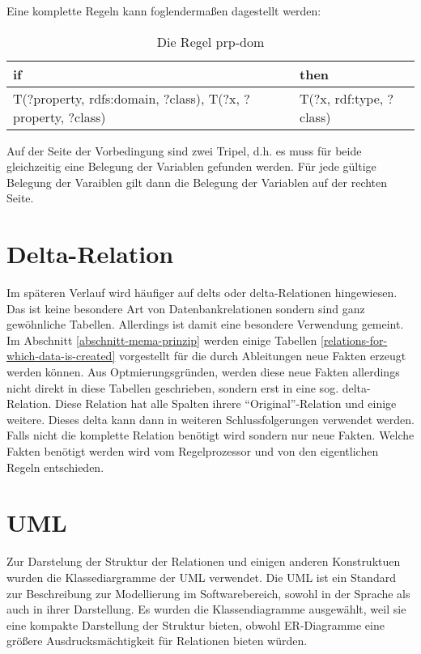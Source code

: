 Eine komplette Regeln kann foglendermaßen dagestellt werden:

\begin{table}[htb]
\begin{center}
\begin{tabular}{m{6cm}|m{4cm}}
if & then \\ \hline
T(?property, rdfs:domain, ?class),\newline
T(?x, ?property, ?class) & T(?x, rdf:type, ?class)
\end{tabular}
\end{center}
\caption{Die Regel prp-dom}
\label{rule-prp-dom}
\end{table}

Auf der Seite der Vorbedingung sind zwei Tripel, d.h. es muss für beide gleichzeitig eine Belegung der Variablen gefunden werden. Für jede gültige Belegung der Varaiblen gilt dann die Belegung der Variablen auf der rechten Seite.

\section{Delta-Relation}
Im späteren Verlauf wird häufiger auf delts oder delta-Relationen hingewiesen. Das ist keine besondere Art von Datenbankrelationen sondern sind ganz gewöhnliche Tabellen. Allerdings ist damit eine besondere Verwendung gemeint. Im Abschnitt \ref{abschnitt-mema-prinzip} werden einige Tabellen \ref{relations-for-which-data-is-created} vorgestellt für die durch Ableitungen neue Fakten erzeugt werden können. Aus Optmierungsgründen, werden diese neue Fakten allerdings nicht direkt in diese Tabellen geschrieben, sondern erst in eine sog. delta-Relation. Diese Relation hat alle Spalten ihrere ``Original''-Relation und einige weitere. Dieses delta kann dann in weiteren Schlussfolgerungen verwendet werden. Falls nicht die komplette Relation benötigt wird sondern nur neue Fakten. Welche Fakten benötigt werden wird vom Regelprozessor und von den eigentlichen Regeln entschieden.


\section{UML}
Zur Darstelung der Struktur der Relationen und einigen anderen Konstruktuen wurden die Klassediargramme der UML\cite{UML2} verwendet. Die UML ist ein Standard zur Beschreibung zur Modellierung im Softwarebereich, sowohl in der Sprache als auch in ihrer Darstellung. Es wurden die Klassendiagramme ausgewählt, weil sie eine kompakte Darstellung der Struktur bieten, obwohl ER-Diagramme eine größere Ausdrucksmächtigkeit für Relationen bieten würden. \cite{Martin2005}

